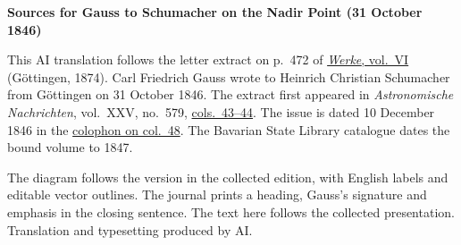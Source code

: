 \clearpage\thispagestyle{empty}
\begin{center}\textbf{Sources for Gauss to Schumacher on the Nadir Point (31 October 1846)}\end{center}
\noindent This AI translation follows the letter extract on p.~472 of \href{https://gdz.sub.uni-goettingen.de/id/PPN236007467}{\textit{Werke}, vol.~VI} (Göttingen, 1874). Carl Friedrich Gauss wrote to Heinrich Christian Schumacher from Göttingen on 31 October 1846. The extract first appeared in \textit{Astronomische Nachrichten}, vol.~XXV, no.~579, \href{https://api.digitale-sammlungen.de/iiif/image/v2/bsb10049450_00030/full/1800,/0/default.jpg}{cols.~43--44}. The issue is dated 10 December 1846 in the \href{https://api.digitale-sammlungen.de/iiif/image/v2/bsb10049450_00032/full/1800,/0/default.jpg}{colophon on col.~48}. The Bavarian State Library catalogue dates the bound volume to 1847.
\par\smallskip\noindent The diagram follows the version in the collected edition, with English labels and editable vector outlines. The journal prints a heading, Gauss’s signature and emphasis in the closing sentence. The text here follows the collected presentation. Translation and typesetting produced by AI.
\clearpage
